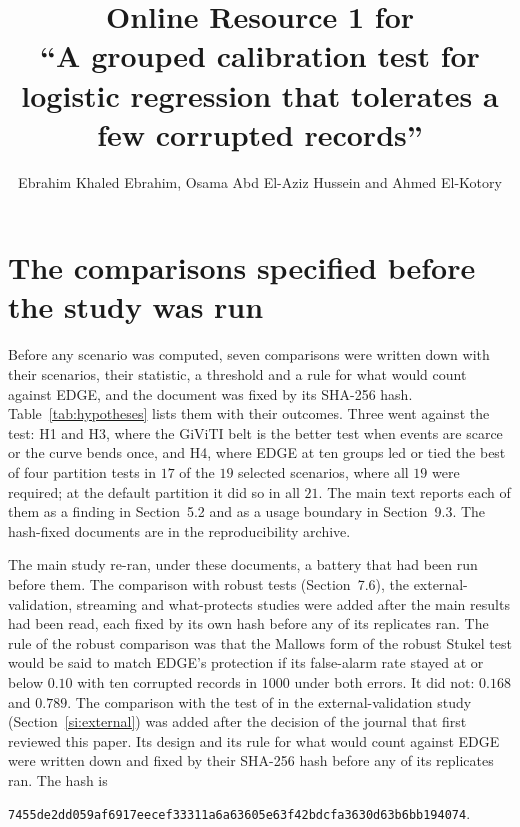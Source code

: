 \documentclass[11pt]{article}
\title{Online Resource 1 for\\ ``A grouped calibration test for logistic regression that tolerates a few corrupted records''}
\author{Ebrahim Khaled Ebrahim, Osama Abd El-Aziz Hussein and Ahmed El-Kotory}
\date{}
\begin{document}
\maketitle

\section{The comparisons specified before the study was run}\label{si:hyp}

Before any scenario was computed, seven comparisons were written down with their scenarios, their
statistic, a threshold and a rule for what would count against EDGE, and the document
was fixed by its SHA-256 hash. Table~\ref{tab:hypotheses} lists them with their outcomes. Three went
against the test: H1 and H3, where the GiViTI belt is the better test when events are scarce or the
curve bends once, and H4, where EDGE at ten groups led or tied the best of four partition
tests in $17$ of the $19$ selected scenarios, where all $19$ were required; at the default partition it
did so in all $21$. The main text reports each of them as a finding in Section~5.2 and as
a usage boundary in Section~9.3. The hash-fixed documents are in the reproducibility archive.

The main study re-ran, under these documents, a battery that had been run before them. The comparison
with robust tests (Section~7.6), the external-validation, streaming and what-protects studies were
added after the main results had been read, each fixed by its own hash before any of its replicates
ran. The rule of the robust comparison was that the Mallows form of the robust Stukel test
would be said to match EDGE's protection if its false-alarm rate stayed at or below $0.10$
with ten corrupted records in $1000$ under both errors. It did not: $0.168$ and $0.789$.
The comparison with the test of \citet{sadatsafavi2024nonparametric} in the external-validation study
(Section~\ref{si:external}) was added after the decision of the journal that first reviewed this paper.
Its design and its rule for what would count against EDGE were written down and fixed by their
SHA-256 hash before any of its replicates ran. The hash is
\begin{center}\small\texttt{7455de2dd059af6917eecef33311a6a63605e63f42bdcfa3630d63b6bb194074}.\end{center}
\end{document}
